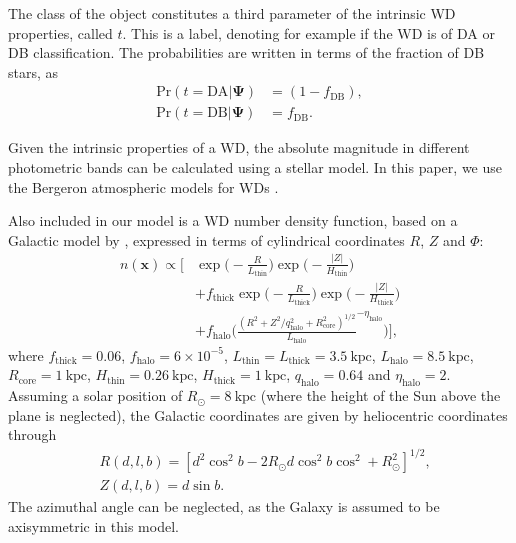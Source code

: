 \documentclass[fleqn,usenatbib]{mnras}
\newcommand{\popp}{\boldsymbol{\Psi}}
\newcommand{\pr}{\text{Pr}}
\newcommand{\kpc}{\text{kpc}}
\begin{document}
The class of the object constitutes a third parameter of the intrinsic WD properties, called $t$. This is a label, denoting for example if the WD is of DA or DB classification. The probabilities are written in terms of the fraction of DB stars, as
\begin{equation}\label{eq:DADB}
\begin{split}
	\pr(t=\text{DA} | \popp) & = (1-f_\text{DB}),\\
    \pr(t=\text{DB} | \popp) & = f_\text{DB}.
\end{split}
\end{equation}

Given the intrinsic properties of a WD, the absolute magnitude in different photometric bands can be calculated using a stellar model. In this paper, we use the Bergeron atmospheric models for WDs \citep{Bergeron:1995we,Finley:1997zz,Bergeron:2000ce,2001PASP..113..409F}.

Also included in our model is a WD number density function, based on a Galactic model by \cite{2008ApJ...673..864J}, expressed in terms of cylindrical coordinates $R$, $Z$ and $\Phi$:
\begin{equation}\label{eq:numberdensity}
\begin{split}
	n(\mathbf{x}) \propto
	\Bigg[ 
		& \exp\Bigg(-\frac{R}{L_\text{thin}}\Bigg)\exp\Bigg(-\frac{|Z|}{H_\text{thin}}\Bigg) \\
		& +f_\text{thick}\exp\Bigg(-\frac{R}{L_\text{thick}}\Bigg)\exp\Bigg(-\frac{|Z|}{H_\text{thick}}\Bigg) \\
		& +f_\text{halo}\Bigg( \frac{(R^2+Z^2/q_\text{halo}^2+R_\text{core}^2)^{1/2}}{L_\text{halo}}^{-\eta_\text{halo}} \Bigg)
	\Bigg],
\end{split}
\end{equation}
where $f_\text{thick}=0.06$, $f_\text{halo}=6\times10^{-5}$, $L_\text{thin}=L_\text{thick}=3.5~\kpc$, $L_\text{halo}=8.5~\kpc$, $R_\text{core}=1~\kpc$, $H_\text{thin}=0.26~\kpc$, $H_\text{thick}=1~\kpc$, $q_\text{halo}=0.64$ and $\eta_\text{halo} = 2$. Assuming a solar position of $R_\odot=8~\kpc$ (where the height of the Sun above the plane is neglected), the Galactic coordinates are given by heliocentric coordinates through
\begin{equation}
\begin{split}
	& R(d,l,b) = [d^2\cos^2b-2 R_\odot d \cos^2b\cos^2+R_\odot^2]^{1/2}, \\
	& Z(d,l,b) = d \sin b.
\end{split}
\end{equation}
The azimuthal angle can be neglected, as the Galaxy is assumed to be axisymmetric in this model.
\end{document}
